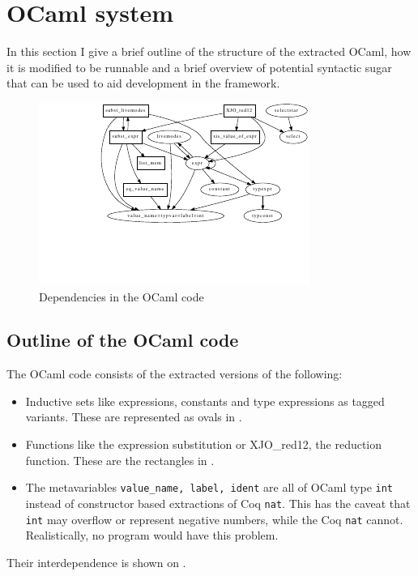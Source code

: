 \documentclass[12pt,twoside,notitlepage]{report}
\begin{document}
\section{OCaml system}
In this section I give a brief outline of the structure of the extracted OCaml, how it is modified to be runnable and a brief overview of potential syntactic sugar that can be used to aid development in the framework. 

\begin{figure}
\centering
\includegraphics[width=\linewidth]{ocamlBaseStruct.pdf}
\caption{Dependencies in the OCaml code}
\label{fig:ocamlBaseStruct}
\end{figure}

\subsection{Outline of the OCaml code}
The OCaml code consists of the extracted versions of the following:
\begin{itemize}
\item{Inductive sets like expressions, constants and type expressions as tagged variants. These are represented as ovals in .}
\item{Functions like the expression substitution or XJO\_red12, the reduction function. These are the rectangles in .}
\item{The metavariables \verb|value_name, label, ident| are all of OCaml type \lstinline|int| instead of constructor based extractions of Coq \lstinline[language={Coq}]|nat|. This has the caveat that \lstinline|int| may overflow or represent negative numbers, while the Coq \lstinline[language={Coq}]|nat| cannot. Realistically, no program would have this problem.}
\end{itemize}
Their interdependence is shown on . 
\end{document}
